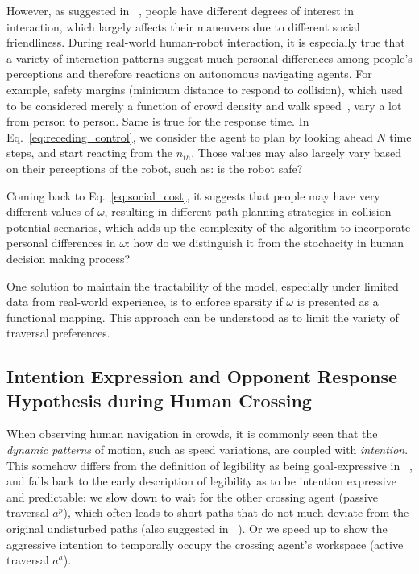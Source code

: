 \documentclass[conference]{IEEEtran}
\begin{document}
However, as suggested in ~\cite{hansen2009adaptive},
people have different degrees of interest in interaction, which largely 
affects their maneuvers due to different social friendliness. During 
real-world human-robot interaction, it is especially true that a variety of 
interaction patterns suggest much personal differences among 
people's perceptions and therefore reactions on autonomous navigating agents. For 
example, safety margins (minimum distance to respond to collision), which used 
to be considered merely a function of crowd density and walk speed~\cite{helbing1995social},
vary a lot from person to person. Same is true for the response time. In 
Eq.~\ref{eq:receding_control}, we consider the agent to plan by looking ahead 
$N$ time steps, and start reacting from the $n_{th}$. Those values may also largely 
vary based on their perceptions of the robot, such as: is the robot safe?  

Coming back to Eq.~\ref{eq:social_cost}, it suggests that people may have 
very different values of $\omega$, resulting in different path planning 
strategies in collision-potential scenarios, which adds up the complexity of the 
algorithm to incorporate personal differences in $\omega$: how do we 
distinguish it from the stochacity in human decision making process? 


One solution to maintain the tractability of the model, especially under 
limited data from real-world experience, is to enforce sparsity if $\omega$ is 
presented as a functional mapping. This approach can be understood as to limit 
the variety of traversal preferences.
\vspace{-.3em}
\subsection{Intention Expression and Opponent Response Hypothesis during Human Crossing}
When observing human navigation in crowds, it is commonly seen that the 
\textit{dynamic patterns} of motion, such as speed variations, are coupled 
with \textit{intention}. This somehow differs from the 
definition of legibility as being goal-expressive in 
~\cite{dragan2013legibility}, and falls back to the early description of 
legibility as to be intention 
expressive and predictable: we slow down to wait for the other crossing agent 
(passive traversal $a^p$), which often leads to short paths that do not much 
deviate from the original undisturbed paths (also suggested in 
~\cite{kruse2012legible}). Or we speed up to show the 
aggressive intention to temporally occupy the crossing agent's workspace (active 
traversal $a^a$). 
\end{document}
